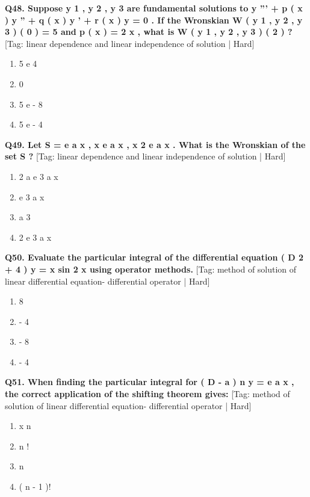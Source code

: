 \noindent\textbf{Q48. Suppose y 1 , y 2 , y 3 are fundamental solutions to y ''' + p ( x ) y '' + q ( x ) y ' + r ( x ) y = 0 . If the Wronskian W ( y 1 , y 2 , y 3 ) ( 0 ) = 5 and p ( x ) = 2 x , what is W ( y 1 , y 2 , y 3 ) ( 2 ) ?} \hfill [Tag: linear dependence and linear independence of solution | Hard]
\begin{enumerate}[label=(\alph*),topsep=2pt,itemsep=1pt,partopsep=0pt,parsep=0pt]
    \item {{5 e 4}}
    \item {{0}}
    \item {{5 e - 8}}
    \item {{5 e - 4}}
\end{enumerate}
\vspace{2mm}

\noindent\textbf{Q49. Let S = { e a x , x e a x , x 2 e a x } . What is the Wronskian of the set S ?} \hfill [Tag: linear dependence and linear independence of solution | Hard]
\begin{enumerate}[label=(\alph*),topsep=2pt,itemsep=1pt,partopsep=0pt,parsep=0pt]
    \item {{2 a e 3 a x}}
    \item {{e 3 a x}}
    \item {{a 3}}
    \item {{2 e 3 a x}}
\end{enumerate}
\vspace{2mm}

\noindent\textbf{Q50. Evaluate the particular integral of the differential equation ( D 2 + 4 ) y = x sin 2 x using operator methods.} \hfill [Tag: method of solution of linear differential equation- differential operator | Hard]
\begin{enumerate}[label=(\alph*),topsep=2pt,itemsep=1pt,partopsep=0pt,parsep=0pt]
    \item {{8}}
    \item {{- 4}}
    \item {{- 8}}
    \item {{- 4}}
\end{enumerate}
\vspace{2mm}

\noindent\textbf{Q51. When finding the particular integral for ( D - a ) n y = e a x , the correct application of the shifting theorem gives:} \hfill [Tag: method of solution of linear differential equation- differential operator | Hard]
\begin{enumerate}[label=(\alph*),topsep=2pt,itemsep=1pt,partopsep=0pt,parsep=0pt]
    \item {{x n}}
    \item {{n !}}
    \item {{n}}
    \item {{( n - 1 )!}}
\end{enumerate}
\vspace{2mm}

